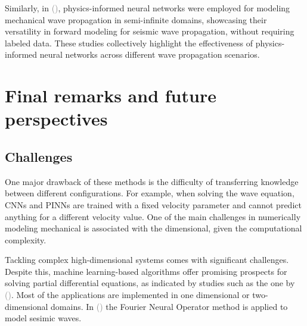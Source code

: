 \documentclass{tufte-handout}
\renewcommand{\citep}[2][]{\textcolor{gray}{(\citeauthor{#2}, \citeyear[#1]{#2})}}
\renewcommand{\citeauthoryear}[2][]{\textcolor{gray}{\citeauthor{#2} (\textcolor{gray}{\citeyear[#1]{#2}})}}
\begin{document}


Similarly, in \citeauthoryear{ren_seismicnet_2024}, physics-informed neural networks were employed for modeling mechanical wave propagation in semi-infinite domains, showcasing their versatility in forward modeling for seismic wave propagation, without requiring labeled data. These studies collectively highlight the effectiveness of physics-informed neural networks across different wave propagation scenarios.




\section{Final remarks and future perspectives}\label{sec:final_remarks_and_perspectives}

\subsection{Challenges}

One major drawback of these methods is the difficulty of transferring knowledge between different configurations. For example, when solving the wave equation, CNNs and PINNs are trained with a fixed velocity parameter and cannot predict anything for a different velocity value. One of the main challenges in numerically modeling mechanical is associated with the dimensional, given the computational complexity.

Tackling complex high-dimensional systems comes with significant challenges. Despite this, machine learning-based algorithms offer promising prospects for solving partial differential equations, as indicated by studies such as the one by \citeauthoryear{blechschmidt_three_2021}. Most of the applications are implemented in one dimensional or two-dimensional domains. In \citeauthoryear{lehmann_fourier_2023} the Fourier Neural Operator method is applied to model sesimic waves.
\end{document}
